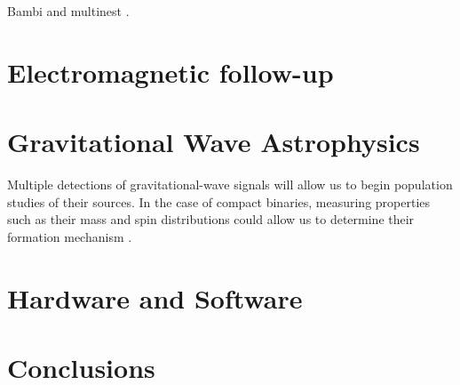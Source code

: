 \documentclass[letterpaper, aps, prd, superscriptaddress, showpacs, nofootinbib]{revtex4}
\begin{document}
Bambi \cite{2012MNRAS.421..169G} and multinest \cite{2009MNRAS.398.1601F}.

\section{Electromagnetic follow-up}
\label{sec:em}


\section{Gravitational Wave Astrophysics}
\label{sec:gw_astro}

Multiple detections of gravitational-wave signals will allow us to begin population studies of their sources.
In the case of compact binaries, measuring properties such as their mass and spin distributions could allow 
us to determine their formation mechanism \cite{0264-9381-27-11-114007, 2017Natur.548..426F, 2017MNRAS.471.2801S, 2015ApJ...810...58S, 0264-9381-34-3-03LT01, 2017PhRvD..95l4046G, 2018arXiv180102699T}.

\section{Hardware and Software}
\label{sec:hard_soft}

\section{Conclusions}
\label{sec:conclusion}





\end{document}
